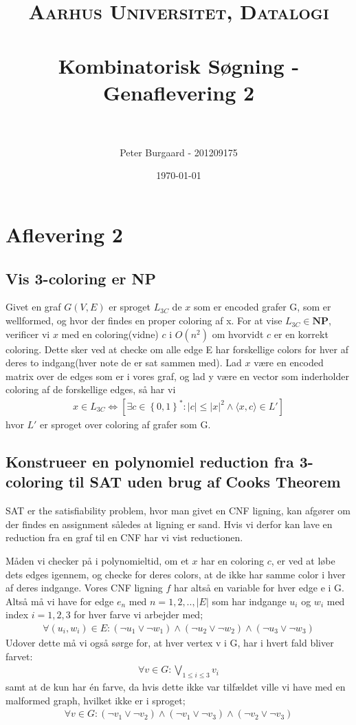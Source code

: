 \documentclass[paper=a4, fontsize=11pt]{scrartcl} %
\title{	
	\normalfont \normalsize 
	\textsc{Aarhus Universitet, Datalogi} \\ [25pt] %
	\horrule{0.5pt} \\[0.4cm] %
	\huge Kombinatorisk Søgning - Genaflevering 2\\ %
	\horrule{2pt} \\[0.5cm] %
}
\author{Peter Burgaard - 201209175} %
\date{\normalsize\today} %
\numberwithin{equation}{section} %
\numberwithin{figure}{section} %
\numberwithin{table}{section} %
\begin{document}
	
	\maketitle %
	
	\section{Aflevering 2}
	
	\subsection{Vis 3-coloring er NP}
	
	Givet en graf $G(V,E)$ er sproget $L_{3C}$ de $x$ som er encoded grafer G, som er wellformed, og hvor der findes en proper coloring af x. For at vise $L_{3C}\in \textbf{NP}$, verificer vi $x$ med en coloring(vidne) $c$ i $O(n^2)$ om hvorvidt $c$ er en korrekt coloring. Dette sker ved at checke om alle edge E har forskellige colors for hver af deres to indgang(hver note de er sat sammen med). Lad $x$ være en encoded matrix over de edges som er i vores graf, og lad y være en vector som inderholder coloring af de forskellige edges, så har vi 
	\begin{align*}
	x\in L_{3C} \iff \left[ \exists c\in \left\lbrace 0,1\right\rbrace ^*:|c|\leq |x|^2 \land \langle x,c \rangle \in L' \right] 
	\end{align*}
	hvor $L'$ er sproget over coloring af grafer som G.
	
	\subsection{Konstrueer en polynomiel reduction fra 3-coloring til SAT uden brug af Cooks Theorem} 
	
	SAT er the satisfiability problem, hvor man givet en CNF ligning, kan afgører om der findes en assignment således at ligning er sand. Hvis vi derfor kan lave en reduction fra en graf til en CNF har vi vist reductionen.
	
	Måden vi checker på i polynomieltid, om et $x$ har en coloring $c$, er ved at løbe dets edges igennem, og checke for deres colors, at de ikke har samme color i hver af deres indgange. Vores CNF ligning $f$ har altså en variable for hver edge e i G. Altså må vi have for edge $e_n$ med $n=1,2,..,|E|$ som har indgange $u_i$ og $w_i$ med index $i=1,2,3$ for hver farve vi arbejder med;  
	\begin{align*}
	\forall(u_i,w_i)\in E:(\lnot u_1\lor\lnot w_1)\land(\lnot u_2\lor\lnot w_2)\land(\lnot u_3\lor\lnot w_3)
	\end{align*}
	Udover dette må vi også sørge for, at hver vertex v i G, har i hvert fald bliver farvet:
	\begin{align*}
	\forall v\in G:\bigvee_{1\leq i\leq 3} v_i 
	\end{align*}
	samt at de kun har én farve, da hvis dette ikke var tilfældet ville vi have med en malformed graph, hvilket ikke er i sproget; 
	\begin{align*}
	\forall v\in G:(\lnot v_1\lor\lnot v_2) \land(\lnot v_1 \lor\lnot v_3) \land(\lnot v_2 \lor\lnot v_3)
	\end{align*}
	
\end{document}
